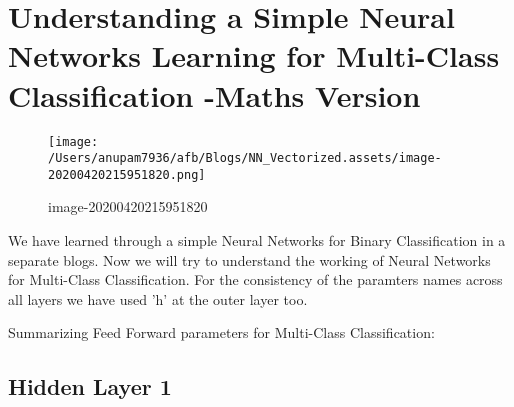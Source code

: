 \documentclass[
]{article}
\author{}
\date{}
\begin{document}
\hypertarget{header-n86}{%
\section{Understanding a Simple Neural Networks Learning for Multi-Class
Classification -Maths Version}\label{header-n86}}

\begin{figure}
\centering
\texttt{[image: /Users/anupam7936/afb/Blogs/NN\_Vectorized.assets/image-20200420215951820.png]}
\caption{image-20200420215951820}
\end{figure}

We have learned through a simple Neural Networks for Binary
Classification in a separate blogs. Now we will try to understand the
working of Neural Networks for Multi-Class Classification. For the
consistency of the paramters names across all layers we have used 'h' at
the outer layer too.

Summarizing Feed Forward parameters for Multi-Class Classification:

\hypertarget{header-n157}{%
\subsection{Hidden Layer 1}\label{header-n157}}
\end{document}
